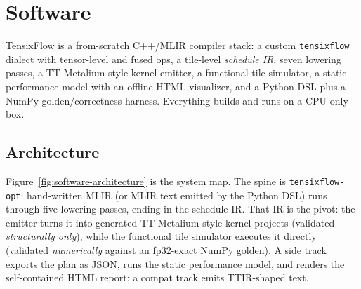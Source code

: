 \section{Software}\label{sec:software}

TensixFlow is a from-scratch C++/MLIR compiler stack: a custom
\texttt{tensixflow} dialect with tensor-level and fused ops, a
tile-level \emph{schedule IR}, seven lowering passes, a TT-Metalium-style
kernel emitter, a functional tile simulator, a static performance model with
an offline HTML visualizer, and a Python DSL plus a NumPy golden/correctness
harness. Everything builds and runs on a CPU-only box.

\subsection{Architecture}\label{sec:software-architecture}

Figure~\ref{fig:software-architecture} is the system map. The spine is
\texttt{tensixflow-opt}: hand-written MLIR (or MLIR text emitted by the
Python DSL) runs through five lowering passes, ending in the schedule IR.
That IR is the pivot: the emitter turns it into generated TT-Metalium-style
kernel projects (validated \emph{structurally only}), while the functional
tile simulator executes it directly (validated \emph{numerically} against an
fp32-exact NumPy golden). A side track exports the plan as JSON, runs the
static performance model, and renders the self-contained HTML report; a
compat track emits TTIR-shaped text.

